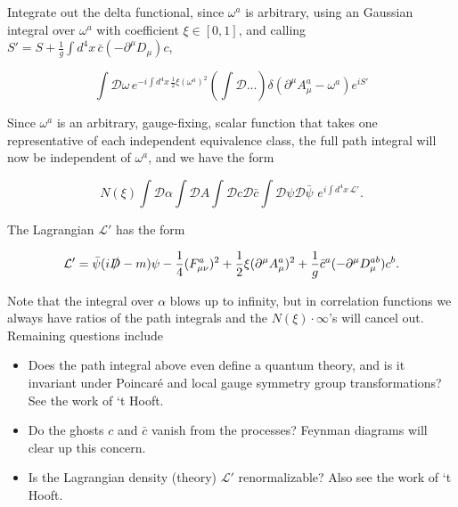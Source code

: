 \noindent Integrate out the delta functional, since $\omega^a$ is arbitrary, using an Gaussian integral over $\omega^a$ with coefficient $\xi \in [0,1]$, and calling $S' = S + \frac{1}{g} \int d^4 x \, \bar{c} (-\partial^\mu D_\mu) c$,

\begin{equation}
\int \mathcal{D} \omega \, e^{-i \int d^4 x \, \frac{1}{2} \xi (\omega^a)^2} \left( \int \mathcal{D} ... \right) \delta( \partial^\mu A_\mu^a - \omega^a) e^{i S'}
\end{equation}

\noindent Since $\omega^a$ is an arbitrary, gauge-fixing, scalar function that takes one representative of each independent equivalence class, the full path integral will now be independent of $\omega^a$, and we have the form

\begin{equation}
N(\xi) \int \mathcal{D} \alpha \int \mathcal{D} A \int \mathcal{D} c \mathcal{D} \bar{c} \int \mathcal{D} \psi \mathcal{D} \bar{\psi} \,\,  e^{i \int d^4 x \, \mathcal{L}'} .
\end{equation}

\noindent The Lagrangian $\mathcal{L}'$ has the form

\begin{equation}
\mathcal{L}' = \bar{\psi} (i \slashed{D} - m) \psi - \frac{1}{4} (F^a_{\mu\nu})^2 + \frac{1}{2} \xi (\partial^\mu A_\mu^a)^2 + \frac{1}{g} \bar{c}^a (-\partial^\mu D_\mu^{ab}) c^b.
\end{equation}

\noindent Note that the integral over $\alpha$ blows up to infinity, but in correlation functions we always have ratios of the path integrals and the $N(\xi) \cdot \infty$'s will cancel out. \\

\noindent Remaining questions include

\begin{itemize}
\item Does the path integral above even define a quantum theory, and is it invariant under Poincar\'e and local gauge symmetry group transformations? 
	\subitem See the work of `t Hooft.
\item Do the ghosts $c$ and $\bar{c}$ vanish from the processes? 
	\subitem Feynman diagrams will clear up this concern.
\item Is the Lagrangian density (theory) $\mathcal{L}'$ renormalizable?
	\subitem Also see the work of `t Hooft.
\end{itemize}
